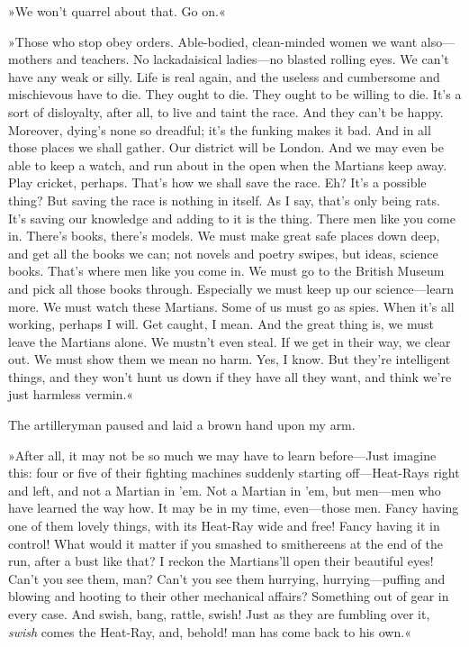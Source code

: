 »We won't quarrel about that. Go on.«

»Those who stop obey orders. Able-bodied, clean-minded women we want also—mothers and teachers. No lackadaisical ladies—no blasted rolling eyes. We can't have any weak or silly. Life is real again, and the useless and cumbersome and mischievous have to die. They ought to die. They ought to be willing to die. It's a sort of disloyalty, after all, to live and taint the race. And they can't be happy. Moreover, dying's none so dreadful; it's the funking makes it bad. And in all those places we shall gather. Our district will be London. And we may even be able to keep a watch, and run about in the open when the Martians keep away. Play cricket, perhaps. That's how we shall save the race. Eh? It's a possible thing? But saving the race is nothing in itself. As I say, that's only being rats. It's saving our knowledge and adding to it is the thing. There men like you come in. There's books, there's models. We must make great safe places down deep, and get all the books we can; not novels and poetry swipes, but ideas, science books. That's where men like you come in. We must go to the British Museum and pick all those books through. Especially we must keep up our science—learn more. We must watch these Martians. Some of us must go as spies. When it's all working, perhaps I will. Get caught, I mean. And the great thing is, we must leave the Martians alone. We mustn't even steal. If we get in their way, we clear out. We must show them we mean no harm. Yes, I know. But they're intelligent things, and they won't hunt us down if they have all they want, and think we're just harmless vermin.«

The artilleryman paused and laid a brown hand upon my arm.

»After all, it may not be so much we may have to learn before—Just imagine this: four or five of their fighting machines suddenly starting off—Heat-Rays right and left, and not a Martian in 'em. Not a Martian in 'em, but men—men who have learned the way how. It may be in my time, even—those men. Fancy having one of them lovely things, with its Heat-Ray wide and free! Fancy having it in control! What would it matter if you smashed to smithereens at the end of the run, after a bust like that? I reckon the Martians'll open their beautiful eyes! Can't you see them, man? Can't you see them hurrying, hurrying—puffing and blowing and hooting to their other mechanical affairs? Something out of gear in every case. And swish, bang, rattle, swish! Just as they are fumbling over it, \textit{swish} comes the Heat-Ray, and, behold! man has come back to his own.«

